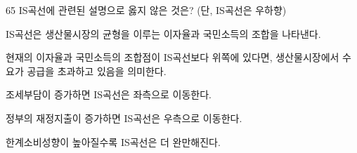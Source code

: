 \begin{question}{65}
IS곡선에 관련된 설명으로 옳지 않은 것은? (단, IS곡선은 우하향)
\begin{choices}
  \item IS곡선은 생산물시장의 균형을 이루는 이자율과 국민소득의 조합을 나타낸다.
  \item 현재의 이자율과 국민소득의 조합점이 IS곡선보다 위쪽에 있다면, 생산물시장에서 수요가 공급을 초과하고 있음을 의미한다.
  \item 조세부담이 증가하면 IS곡선은 좌측으로 이동한다.
  \item 정부의 재정지출이 증가하면 IS곡선은 우측으로 이동한다.
  \item 한계소비성향이 높아질수록 IS곡선은 더 완만해진다.
\end{choices}
\end{question}
